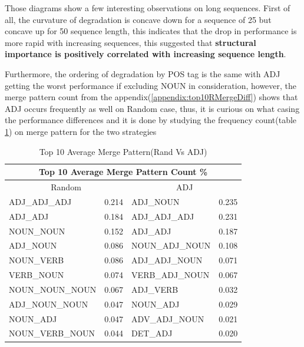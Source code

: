 \documentclass[12pt]{article}
\begin{document}
Those diagrams show a few interesting observations on long sequences. First of all, the curvature of degradation is concave down for a sequence of 25 but concave up for 50 sequence length, this indicates that the drop in performance is more rapid with increasing sequences, this suggested that \textbf{structural importance is positively correlated with increasing sequence length}. 

Furthermore, the ordering of degradation by POS tag is the same with ADJ getting the worst performance if excluding NOUN in consideration, however, the merge pattern count from the appendix(\ref{appendix:top10RMergeDiff}) shows that ADJ occurs frequently as well on Random case, thus, it is curious on what casing the performance differences and it is done by studying the frequency count(table \ref{tab:top10AvgMegePatternRandADJ}) on merge pattern for the two strategies
\begin{table}[!h]
\fontsize{10pt}{10pt}\selectfont
\begin{center}
\begin{tabular}{|llll|}
\hline
\multicolumn{4}{|c|}{Top 10 Average Merge Pattern Count \%}                                                        \\ \hline
\multicolumn{2}{|c|}{Random}                                        & \multicolumn{2}{c|}{ADJ}                     \\ \hline
\multicolumn{1}{|l|}{ADJ\_ADJ\_ADJ}    & \multicolumn{1}{l|}{0.214} & \multicolumn{1}{l|}{ADJ\_NOUN}       & 0.235 \\ \hline
\multicolumn{1}{|l|}{ADJ\_ADJ}         & \multicolumn{1}{l|}{0.184} & \multicolumn{1}{l|}{ADJ\_ADJ\_ADJ}   & 0.231 \\ \hline
\multicolumn{1}{|l|}{NOUN\_NOUN}       & \multicolumn{1}{l|}{0.152} & \multicolumn{1}{l|}{ADJ\_ADJ}        & 0.187 \\ \hline
\multicolumn{1}{|l|}{ADJ\_NOUN}        & \multicolumn{1}{l|}{0.086} & \multicolumn{1}{l|}{NOUN\_ADJ\_NOUN} & 0.108 \\ \hline
\multicolumn{1}{|l|}{NOUN\_VERB}       & \multicolumn{1}{l|}{0.086} & \multicolumn{1}{l|}{ADJ\_ADJ\_NOUN}  & 0.071 \\ \hline
\multicolumn{1}{|l|}{VERB\_NOUN}       & \multicolumn{1}{l|}{0.074} & \multicolumn{1}{l|}{VERB\_ADJ\_NOUN} & 0.067 \\ \hline
\multicolumn{1}{|l|}{NOUN\_NOUN\_NOUN} & \multicolumn{1}{l|}{0.067} & \multicolumn{1}{l|}{ADJ\_VERB}       & 0.032 \\ \hline
\multicolumn{1}{|l|}{ADJ\_NOUN\_NOUN}  & \multicolumn{1}{l|}{0.047} & \multicolumn{1}{l|}{NOUN\_ADJ}       & 0.029 \\ \hline
\multicolumn{1}{|l|}{NOUN\_ADJ}        & \multicolumn{1}{l|}{0.047} & \multicolumn{1}{l|}{ADV\_ADJ\_NOUN}  & 0.021 \\ \hline
\multicolumn{1}{|l|}{NOUN\_VERB\_NOUN} & \multicolumn{1}{l|}{0.044} & \multicolumn{1}{l|}{DET\_ADJ}        & 0.020 \\ \hline
\end{tabular}
\caption{Top 10 Average Merge Pattern(Rand Vs ADJ)}
\label{tab:top10AvgMegePatternRandADJ}
\end{center}
\end{table}
\end{document}
